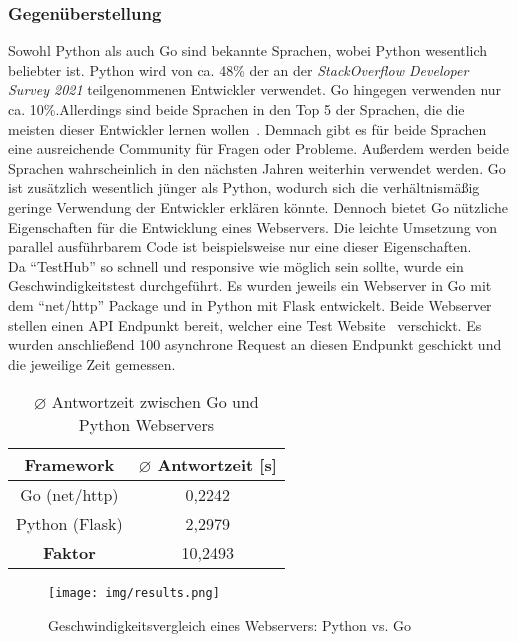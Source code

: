 \subsubsection{Gegenüberstellung}
Sowohl Python als auch Go sind bekannte Sprachen, wobei Python wesentlich 
beliebter ist. Python wird von ca. 48\% der an der \textit{StackOverflow 
Developer Survey 2021} teilgenommenen Entwickler verwendet. Go hingegen verwenden nur ca. 
10\%.Allerdings sind beide Sprachen in den Top 5 der Sprachen, die die meisten dieser Entwickler
lernen wollen~\cite{Sta21}. Demnach gibt es für beide Sprachen eine ausreichende
Community für Fragen oder Probleme. Außerdem werden beide Sprachen wahrscheinlich
in den nächsten Jahren weiterhin verwendet werden. Go ist zusätzlich wesentlich jünger als
Python, wodurch sich die verhältnismäßig geringe Verwendung der Entwickler erklären könnte.
Dennoch bietet Go nützliche Eigenschaften für die Entwicklung eines Webservers.
Die leichte Umsetzung von parallel ausführbarem Code ist beispielsweise nur eine dieser Eigenschaften.\\

Da ``TestHub'' so schnell und responsive wie möglich sein sollte, wurde ein 
Geschwindigkeitstest durchgeführt. Es wurden jeweils ein Webserver in Go mit 
dem ``net/http'' Package und in Python mit Flask entwickelt. Beide Webserver stellen
einen \gls{API} Endpunkt bereit, welcher eine Test Website~\cite{Bra22} verschickt.
Es wurden anschließend 100 asynchrone Request an diesen Endpunkt geschickt und die jeweilige
Zeit gemessen.

\begin{table}[H]
    \centering
    \begin{tabular}{|c | c|} 
     \hline
     \textbf{Framework} & \textbf{$\diameter$ Antwortzeit [s]} \\ [0.5ex] 
     \hline
     Go (net/http) & 0,2242 \\ [0.5ex]
     \hline
     Python (Flask) & 2,2979 \\ [0.5ex] 
     \hline
     \textbf{Faktor} & 10,2493 \\ [1ex] 
     \hline
    \end{tabular}
    \caption{$\diameter$ Antwortzeit zwischen Go und Python Webservers}
    \label{table:1}
\end{table}

\begin{figure}[H]
    \texttt{[image: img/results.png]}
    \caption{Geschwindigkeitsvergleich eines Webservers: Python vs. Go}\label{fig:speedtestresults}
\end{figure}

